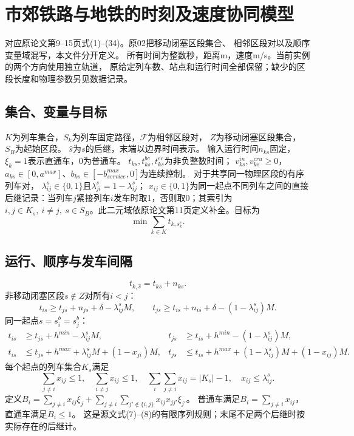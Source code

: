 \documentclass{ctexart}
\begin{document}
\section*{市郊铁路与地铁的时刻及速度协同模型}
对应原论文第9--15页式(1)--(34)。原02把移动闭塞区段集合、
相邻区段对以及顺序变量域混写，本文件分开定义。
所有时间为整数秒，距离m，速度m/s。当前实例的两个方向使用独立轨道，
原给定列车数、站点和运行时间全部保留；缺少的区段长度和物理参数另见数据记录。

\subsection*{集合、变量与目标}
$K$为列车集合，$S_k$为列车固定路径，$\mathcal F$为相邻区段对，
$Z$为移动闭塞区段集合，$S_B$为起始区段。
$\widehat s$为$s$的后继，末端以边界时间表示。
输入运行时间$n_{ks}$固定，$\xi_k=1$表示直通车，0为普通车。
$t_{ks},t^{bc}_{ks},t^{ec}_{ks}$为非负整数时间；
$v^{in}_{ks},v^{cru}_{ks}\ge0$，
$a_{ks}\in[0,a^{max}]$、$b_{ks}\in[-b^{max}_{service},0]$为连续控制。
对于共享同一物理区段的有序列车对，
$\lambda_{ij}^s\in\{0,1\}$且$\lambda_{ji}^s=1-\lambda_{ij}^s$；
$x_{ij}\in\{0,1\}$为同一起点不同列车之间的直接后继记录：当列车$j$紧接列车$i$发车时取1，否则取0；其索引为$i,j\in K_s,\ i\ne j,\ s\in S_B$。此二元域依原论文第11页定义补全。目标为
\[
\min\sum_{k\in K}t_{k,s_k^e}.
\]

\subsection*{运行、顺序与发车间隔}
\[
t_{k,\widehat s}=t_{ks}+n_{ks}.
\]
非移动闭塞区段$s\notin Z$对所有$i<j$：
\[
t_{is}\ge t_{js}+n_{js}+\delta-\lambda_{ij}^sM,\qquad
t_{js}\ge t_{is}+n_{is}+\delta-(1-\lambda_{ij}^s)M.
\]
同一起点$s=s_i^b=s_j^b$：
\begin{align*}
t_{is}&\ge t_{js}+h^{min}-\lambda_{ij}^sM,&
t_{js}&\ge t_{is}+h^{min}-(1-\lambda_{ij}^s)M,\\
t_{is}&\le t_{js}+h^{max}+\lambda_{ij}^sM+(1-x_{ji})M,&
t_{js}&\le t_{is}+h^{max}+(1-\lambda_{ij}^s)M+(1-x_{ij})M.
\end{align*}
每个起点的列车集合$K_s$满足
\[
\sum_{j\ne i}x_{ij}\le1,\quad \sum_{i\ne j}x_{ij}\le1,\quad
\sum_i\sum_{j\ne i}x_{ij}=|K_s|-1,\quad x_{ij}\le\lambda_{ij}^s.
\]
定义$B_i=\sum_{j\ne i}x_{ij}\xi_j+
\sum_{j\ne i}\sum_{j'\notin\{i,j\}}x_{ij}x_{jj'}\xi_{j'}$。
普通车满足$B_i=\sum_{j\ne i}x_{ij}$，直通车满足$B_i\le1$。
这是源文式(7)--(8)的有限序列规则；末尾不足两个后继时按实际存在的后继计。
\end{document}
